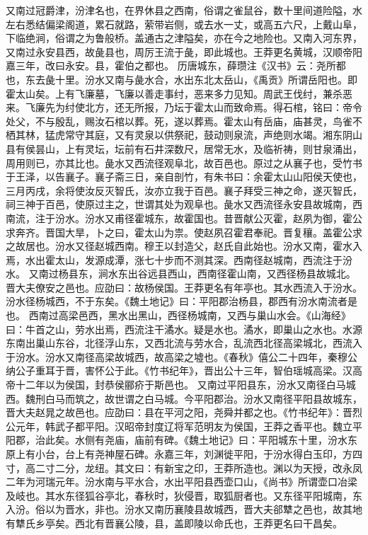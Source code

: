 \documentclass[12pt,UTF8]{ctexbook}
\begin{document}
又南过冠爵津，汾津名也，在界休县之西南，俗谓之雀鼠谷，数十里间道险隘，水左右悉结偏梁阁道，累石就路，萦带岩侧，或去水一丈，或高五六尺，上戴山阜，下临绝涧，俗谓之为鲁般桥。盖通古之津隘矣，亦在今之地险也。又南入河东界，又南过永安县西，故彘县也，周厉王流于彘，即此城也。王莽更名黄城，汉顺帝阳嘉三年，改曰永安。县，霍伯之都也。
历唐城东，薛瓒注《汉书》云：尧所都也，东去彘十里。汾水又南与彘水合，水出东北太岳山，《禹贡》所谓岳阳也。即霍太山矣。上有飞廉墓，飞廉以善走事纣，恶来多力见知。周武王伐纣，兼杀恶来。飞廉先为纣使北方，还无所报，乃坛于霍太山而致命焉。得石棺，铭曰：帝令处父，不与殷乱，赐汝石棺以葬。死，遂以葬焉。霍太山有岳庙，庙甚灵，鸟雀不栖其林，猛虎常守其庭，又有灵泉以供祭祀，鼓动则泉流，声绝则水竭。湘东阴山县有侯昙山，上有灵坛，坛前有石井深数尺，居常无水，及临祈祷，则甘泉涌出，周用则已，亦其比也。彘水又西流径观阜北，故百邑也。原过之从襄子也，受竹书于王泽，以告襄子。襄子斋三日，亲自剖竹，有朱书曰：余霍太山山阳侯天使也，三月丙戌，余将使汝反灭智氏，汝亦立我于百邑。襄子拜受三神之命，遂灭智氏，祠三神于百邑，使原过主之，世谓其处为观阜也。彘水又西流径永安县故城南，西南流，注于汾水。汾水又甫径霍城东，故霍国也。昔晋献公灭霍，赵夙为御，霍公求奔齐。晋国大旱，卜之曰，霍太山为祟。使赵夙召霍君奉祀。晋复穰。盖霍公求之故居也。汾水又径赵城西南。穆王以封造父，赵氏自此始也。汾水又南，霍水入焉，水出霍太山，发源成潭，涨七十步而不测其深。西南径赵城南，西流注于汾水。
又南过杨县东，涧水东出谷远县西山，西南径霍山南，又西径杨县故城北。晋大夫僚安之邑也。应劭曰：故杨侯国。王莽更名有年亭也。其水西流入于汾水。汾水径杨城西，不于东矣。《魏土地记》曰：平阳郡治杨县，郡西有汾水南流者是也。
西南过高梁邑西，黑水出黑山，西径杨城南，又西与巢山水会。《山海经》曰：牛首之山，劳水出焉，西流注干潏水。疑是水也。潏水，即巢山之水也。水源东南出巢山东谷，北径浮山东，又西北流与劳水合，乱流西北径高梁城北，西流入于汾水。汾水又南径高梁故城西，故高梁之墟也。《春秋》僖公二十四年，秦穆公纳公子重耳于晋，害怀公于此。《竹书纪年》，晋出公十三年，智伯瑶城高梁。汉高帝十二年以为侯国，封恭侯郦疥于斯邑也。
又南过平阳县东，汾水又南径白马城西。魏刑白马而筑之，故世谓之白马城。今平阳郡治。汾水又南径平阳县故城东，晋大夫赵晁之故邑也。应劭曰：县在平河之阳，尧舜并都之也。《竹书纪年》：晋烈公元年，韩武子都平阳。汉昭帝封度辽将军范明友为侯国，王莽之香平也。魏立平阳郡，治此矣。水侧有尧庙，庙前有碑。《魏土地记》曰：平阳城东十里，汾水东原上有小台，台上有尧神屋石碑。永嘉三年，刘渊徙平阳，于汾水得白玉印，方四寸，高二寸二分，龙纽。其文曰：有新宝之印，王莽所造也。渊以为天授，改永凤二年为河瑞元年。汾水南与平水合，水出平阳县西壶口山，《尚书》所谓壶口冶梁及岐也。其水东径狐谷亭北，春秋时，狄侵晋，取狐厨者也。又东径平阳城南，东入汾。俗以为晋水，非也。汾水又南历襄陵县故城西，晋大夫郤犨之邑也，故其地有犨氏乡亭矣。西北有晋襄公陵，县，盖即陵以命氏也，王莽更名曰干昌矣。
\end{document}
